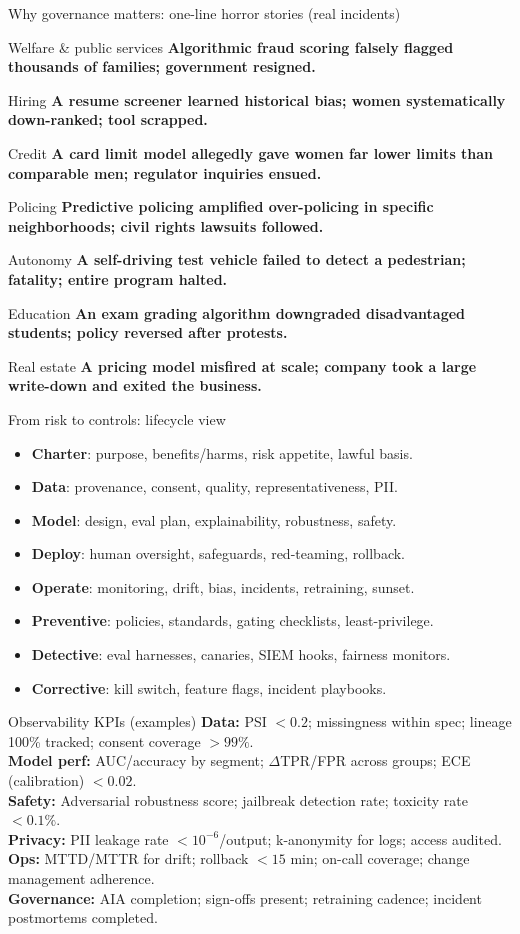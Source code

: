 \documentclass[11pt,aspectratio=169]{beamer}
\newcommand{\Horror}[2]{%
  \begin{block}{#1}
  \Large \textbf{\alert{#2}}
  \end{block}
}
\newcommand{\KPI}[2]{\textbf{#1:} #2\\}
\newcommand{\SECHdr}[1]{\vspace{-2pt}\textbf{\color{MasoodBlue}{#1}}\vspace{2pt}\par}
\begin{document}
\begin{frame}{Why governance matters: one-line horror stories (real incidents)}
\Horror{Welfare \& public services}{Algorithmic fraud scoring falsely flagged thousands of families; government resigned.}
\Horror{Hiring}{A resume screener learned historical bias; women systematically down-ranked; tool scrapped.}
\Horror{Credit}{A card limit model allegedly gave women far lower limits than comparable men; regulator inquiries ensued.}
\Horror{Policing}{Predictive policing amplified over-policing in specific neighborhoods; civil rights lawsuits followed.}
\Horror{Autonomy}{A self-driving test vehicle failed to detect a pedestrian; fatality; entire program halted.}
\Horror{Education}{An exam grading algorithm downgraded disadvantaged students; policy reversed after protests.}
\Horror{Real estate}{A pricing model misfired at scale; company took a large write-down and exited the business.}
\end{frame}

\begin{frame}{From risk to controls: lifecycle view}
\SECHdr{Map risks to stages}
\begin{itemize}
  \item \textbf{Charter}: purpose, benefits/harms, risk appetite, lawful basis.
  \item \textbf{Data}: provenance, consent, quality, representativeness, PII.
  \item \textbf{Model}: design, eval plan, explainability, robustness, safety.
  \item \textbf{Deploy}: human oversight, safeguards, red-teaming, rollback.
  \item \textbf{Operate}: monitoring, drift, bias, incidents, retraining, sunset.
\end{itemize}
\SECHdr{Control types}
\begin{itemize}
  \item \textbf{Preventive}: policies, standards, gating checklists, least-privilege.
  \item \textbf{Detective}: eval harnesses, canaries, SIEM hooks, fairness monitors.
  \item \textbf{Corrective}: kill switch, feature flags, incident playbooks.
\end{itemize}
\end{frame}

\begin{frame}{Observability KPIs (examples)}
\small
\KPI{Data} {PSI $< 0.2$; missingness within spec; lineage 100\% tracked; consent coverage $> 99\%$.}
\KPI{Model perf}{AUC/accuracy by segment; $\Delta$TPR/FPR across groups; ECE (calibration) $< 0.02$.}
\KPI{Safety}{Adversarial robustness score; jailbreak detection rate; toxicity rate $< 0.1\%$.}
\KPI{Privacy}{PII leakage rate $<10^{-6}$/output; k-anonymity for logs; access audited.}
\KPI{Ops}{MTTD/MTTR for drift; rollback $<15$ min; on-call coverage; change management adherence.}
\KPI{Governance}{AIA completion; sign-offs present; retraining cadence; incident postmortems completed.}
\end{frame}
\end{document}
